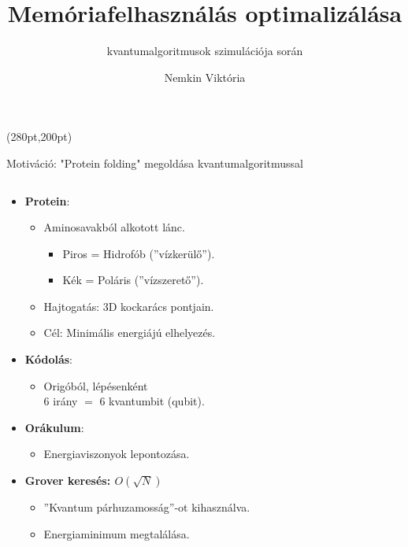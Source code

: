 \documentclass[aspectratio=169]{beamer}
\author[Nemkin Viktória]{Nemkin Viktória}
\institute[]{
\begin{small}dr. Friedl Katalin\end{small}\\
\begin{footnotesize}Számítástudományi és Információelméleti Tanszék\end{footnotesize}
}
\title{Memóriafelhasználás optimalizálása}
\subtitle{kvantumalgoritmusok szimulációja során}
\date{}
\begin{document}
\begin{frame}
\titlepage

\begin{textblock*}{150pt}(280pt,200pt) %

\end{textblock*}
\end{frame}


\begin{frame}{Motiváció: "Protein folding" megoldása kvantumalgoritmussal}

\begin{columns}
\begin{column}{0.55\textwidth}
\vspace{-0.3cm}
\begin{itemize}
    \item \textbf{Protein}:
    \begin{itemize}
        \item Aminosavakból alkotott lánc.
        \begin{itemize}
          \item \color{red} Piros = Hidrofób (''vízkerülő'').
          \item \color{blue} Kék = Poláris (''vízszerető'').
        \end{itemize}
        \item Hajtogatás: 3D kockarács pontjain.
        \item Cél: Minimális energiájú elhelyezés.
    \end{itemize}
    \item \textbf{Kódolás}:
    \begin{itemize}
        \item Origóból, lépésenként \\$6$ irány $=$ $6$ kvantumbit (qubit).
    \end{itemize}
    \item \textbf{Orákulum}: 
    \begin{itemize}
        \item Energiaviszonyok lepontozása.
    \end{itemize}
    \item \textbf{Grover keresés: $O(\sqrt{N})$}
    \begin{itemize}
        \item ''Kvantum párhuzamosság''-ot kihasználva.
        \item Energiaminimum megtalálása.
    \end{itemize}
\end{itemize}

\end{column}
\end{columns}
\end{frame}
\end{document}
